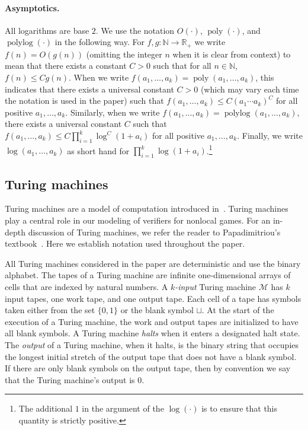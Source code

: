 \documentclass[11pt]{article}
\theoremstyle{definition}
\newcommand{\N}{\ensuremath{\mathbb{N}}}
\newcommand{\R}{\ensuremath{\mathbb{R}}}
\DeclareMathOperator{\poly}{poly}
\DeclareMathOperator{\polylog}{polylog}
\renewcommand{\cal}[1]{\mathcal{#1}}
\begin{document}
\paragraph{Asymptotics.}
All logarithms are base $2$.
We use the notation $O(\cdot)$, $\poly(\cdot)$, and $\polylog(\cdot)$ in the
following way.
For $f,g:\N\to\R_+$ we write $f(n)=O(g(n))$ (omitting the integer $n$ when it is
clear from context) to mean that there exists a constant $C>0$ such that for all
$n\in\N$, $f(n)\leq C g(n)$.
When we write $f(a_1,\ldots,a_k) = \poly(a_1,\ldots,a_k)$, this indicates that
there exists a universal constant $C > 0$ (which may vary each time the notation
is used in the paper) such that $f(a_1,\ldots,a_k) \leq C( a_1 \cdots a_k)^C$
for all positive $a_1,\ldots,a_k$.
Similarly, when we write $f(a_1,\ldots,a_k) = \polylog(a_1,\ldots,a_k)$, there
exists a universal constant $C$ such that $f(a_1,\ldots,a_k) \leq C\prod_{i =
  1}^k \log^C (1+ a_i)$ for all positive $a_1,\ldots,a_k$.
Finally, we write $\log(a_1,\ldots,a_k)$ as short hand for $\prod_{i = 1}^k \log
(1 + a_i)$.\footnote{The additional $1$ in the argument of the $\log(\cdot)$ is
  to ensure that this quantity is strictly positive.}

\subsection{Turing machines}
\label{sec:tms}

Turing machines are a model of computation introduced
in~\cite{turing1937computable}.
Turing machines play a central role in our modeling of verifiers for nonlocal
games.
For an in-depth discussion of Turing machines, we refer the reader to
Papadimitriou's textbook~\cite{Pap94}.
Here we establish notation used throughout the paper. 

All Turing machines considered in the paper are deterministic and use the binary
alphabet.
The tapes of a Turing machine are infinite one-dimensional arrays of cells that
are indexed by natural numbers.
A \emph{$k$-input} Turing machine $\cal{M}$ has $k$ input tapes, one work tape,
and one output tape.
Each cell of a tape has symbols taken either from the set $\{0,1\}$ or the blank
symbol $\sqcup$.
At the start of the execution of a Turing machine, the work and output tapes are
initialized to have all blank symbols.
A Turing machine \emph{halts} when it enters a designated halt state.
The \emph{output} of a Turing machine, when it halts, is the binary string that
occupies the longest initial stretch of the output tape that does not have a
blank symbol.
If there are only blank symbols on the output tape, then by convention we say
that the Turing machine's output is $0$.
\end{document}
